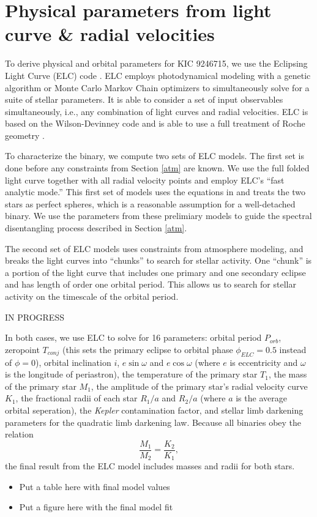 \section{Physical parameters from light curve \& radial velocities}\label{model}
To derive physical and orbital parameters for KIC 9246715, we use the Eclipsing Light Curve (ELC) code \citep{oro00}. ELC employs photodynamical modeling with a genetic algorithm or Monte Carlo Markov Chain optimizers to simultaneously solve for a suite of stellar parameters. It is able to consider a set of input observables simultaneously, i.e., any combination of light curves and radial velocities. ELC is based on the Wilson-Devinney code \citep{wil71} and is able to use a full treatment of Roche geometry \citep{avn75}.

To characterize the binary, we compute two sets of ELC models. The first set is done before any constraints from Section \ref{atm} are known. We use the full folded light curve together with all radial velocity points and employ ELC's ``fast analytic mode.'' This first set of models uses the equations in \citet{gim06} and treats the two stars as perfect spheres, which is a reasonable assumption for a well-detached binary. We use the parameters from these prelimiary models to guide the spectral disentangling process described in Section \ref{atm}.

The second set of ELC models uses constraints from atmosphere modeling, and breaks the light curves into ``chunks'' to search for stellar activity. One ``chunk'' is a portion of the light curve that includes one primary and one secondary eclipse and has length of order one orbital period. This allows us to search for stellar activity on the timescale of the orbital period.

IN PROGRESS

In both cases, we use ELC to solve for 16 parameters: orbital period $P_{orb}$, zeropoint $T_{conj}$ (this sets the primary eclipse to orbital phase $\phi_{ELC} = 0.5$ instead of $\phi = 0$), orbital inclination $i$, $e \sin \omega$ and $e \cos \omega$ (where $e$ is eccentricity and $\omega$ is the longitude of periastron), the temperature of the primary star $T_1$, the mass of the primary star $M_1$, the amplitude of the primary star's radial velocity curve $K_1$, the fractional radii of each star $R_1/a$ and $R_2/a$ (where $a$ is the average orbital seperation), the \emph{Kepler} contamination factor, and stellar limb darkening parameters for the quadratic limb darkening law. Because all binaries obey the relation
\begin{equation}
\frac{M_1}{M_2} = \frac{K_2}{K_1},
\end{equation}
the final result from the ELC model includes masses and radii for both stars.

\begin{itemize}
\item Put a table here with final model values
\item Put a figure here with the final model fit
\end{itemize}
